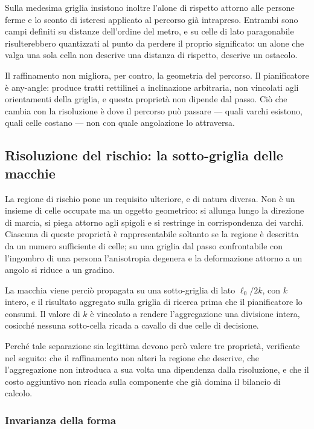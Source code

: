 Sulla medesima griglia insistono inoltre l'alone di rispetto attorno alle persone ferme e lo
sconto di isteresi applicato al percorso già intrapreso. Entrambi sono campi definiti su
distanze dell'ordine del metro, e su celle di lato paragonabile risulterebbero quantizzati al
punto da perdere il proprio significato: un alone che valga una sola cella non descrive una
distanza di rispetto, descrive un ostacolo.

Il raffinamento non migliora, per contro, la geometria del percorso. Il pianificatore è
any-angle: produce tratti rettilinei a inclinazione arbitraria, non vincolati agli orientamenti
della griglia, e questa proprietà non dipende dal passo. Ciò che cambia con la risoluzione è
dove il percorso può passare — quali varchi esistono, quali celle costano — non con quale
angolazione lo attraversa.

\subsection{Risoluzione del rischio: la sotto-griglia delle macchie}
\label{sec:sottogriglia-rischio}

La regione di rischio pone un requisito ulteriore, e di natura diversa. Non è un insieme di
celle occupate ma un oggetto geometrico: si allunga lungo la direzione di marcia, si piega
attorno agli spigoli e si restringe in corrispondenza dei varchi. Ciascuna di queste proprietà è
rappresentabile soltanto se la regione è descritta da un numero sufficiente di celle; su una
griglia dal passo confrontabile con l'ingombro di una persona l'anisotropia degenera e la
deformazione attorno a un angolo si riduce a un gradino.

La macchia viene perciò propagata su una sotto-griglia di lato $\ell_0/2k$, con $k$ intero, e il
risultato aggregato sulla griglia di ricerca prima che il pianificatore lo consumi. Il valore di
$k$ è vincolato a rendere l'aggregazione una divisione intera, cosicché nessuna sotto-cella
ricada a cavallo di due celle di decisione.

Perché tale separazione sia legittima devono però valere tre proprietà, verificate nel seguito:
che il raffinamento non alteri la regione che descrive, che l'aggregazione non introduca a sua
volta una dipendenza dalla risoluzione, e che il costo aggiuntivo non ricada sulla componente
che già domina il bilancio di calcolo.

\subsubsection{Invarianza della forma}

